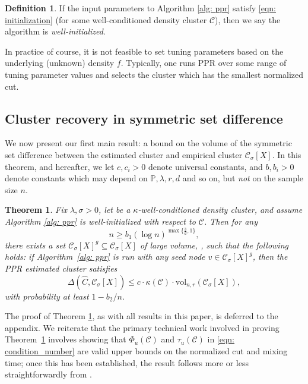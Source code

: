 \documentclass[11pt,twoside]{article}
\newtheorem{theorem}{Theorem}
\theoremstyle{definition}
\newtheorem{definition}{Definition}
\newcommand{\vol}{\mathrm{vol}}
\newcommand{\1}{\mathbbm{1}}
\newcommand{\Phibf}{\Phi_{u}}
\newcommand{\taubf}{\tau_{u}}
\newcommand{\Xbf}{X}
\newcommand{\Pbb}{\mathbb{P}}
\newcommand{\Cbb}{\mathbb{C}}
\newcommand{\Cset}{\mathcal{C}}
\newcommand{\Csig}{\Cset_{\sigma}}
\newcommand{\Cest}{\widehat{C}}
\begin{document}
\begin{definition}
If the input parameters to Algorithm \ref{alg: ppr} satisfy \eqref{eqn:
  initialization} (for some well-conditioned density cluster $\Cset$), then we  
say the algorithm is \emph{well-initialized}. 
\end{definition}

In practice of course, it is not feasible to set tuning parameters based on the 
underlying (unknown) density $f$. Typically, one runs PPR over some range of
tuning parameter values and selects the cluster which has the smallest
normalized cut.     

\subsection{Cluster recovery in symmetric set difference}

We now present our first main result: a bound on the volume of the symmetric set
difference between the estimated cluster \smash{$\Cest$} and empirical cluster 
$\Csig[\Xbf]$. In this theorem, and hereafter, we let $c, c_i > 0$ denote
universal constants, and $b,b_i > 0$ denote constants which may depend on  
$\Pbb,\lambda,r,d$ and so on, but \emph{not} on the sample size 
$n$.  %

\begin{theorem}
  \label{thm: volume_ssd}
  Fix $\lambda,\sigma > 0$, let \smash{$\Cset \in \Cbb_f(\lambda)$} be a   
  $\kappa$-well-conditioned density cluster, and assume Algorithm \ref{alg: ppr}
  is well-initialized with respect to $\Cset$. Then for any 
  $$
  n \geq b_1 (\log n)^{\max\{\frac{3}{d},1\}},
  $$
  there exists a set $\Csig[\Xbf]^g 
  \subseteq \Csig[\Xbf]$ of large volume, \smash{$\vol_{n,r}(\Csig[\Xbf]^g)
    \geq \vol_{n,r}(\Csig[\Xbf])/2$}, such that the following holds: if 
  Algorithm~\ref{alg: ppr} is run with any seed node $v \in \Csig[\Xbf]^g$, then
  the PPR estimated cluster \smash{$\Cest$} satisfies
  \begin{equation}
    \label{eqn: volume_ssd}
    \Delta(\Cest, \Csig[\Xbf]) \leq c \cdot \kappa(\Cset) \cdot
    \vol_{n,r}(\Csig[\Xbf]),  
  \end{equation}
  with probability at least $1 - b_2/n$. 
\end{theorem}

The proof of Theorem \ref{thm: volume_ssd}, as with all results in this paper,
is deferred to the appendix.  We reiterate that the primary technical 
work involved in proving Theorem~\ref{thm: volume_ssd} involves showing that
$\Phibf(\Cset)$ and $\taubf(\Cset)$ in \eqref{eqn: condition_number} are
valid upper bounds on the normalized cut and mixing time; once this has been 
established, the result follows more or less straightforwardly
from \citet{zhu2013}.  
\end{document}
